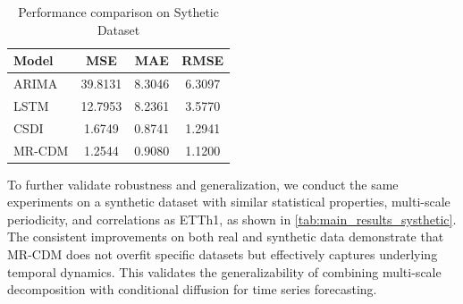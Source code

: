 
\begin{table}[h]
\centering
\caption{Performance comparison on Sythetic Dataset}
\label{tab:main_results_systhetic}
\begin{tabular}{lccc}
\hline
Model & MSE & MAE & RMSE\\
\hline
ARIMA & {39.8131} & {8.3046} & {6.3097}\\
LSTM & {12.7953} & {8.2361} & {3.5770}\\
CSDI & {1.6749} & {0.8741} & {1.2941}\\
MR-CDM & {1.2544} & {0.9080} & {1.1200}\\
\hline
\end{tabular}
\end{table}

To further validate robustness and generalization, we conduct the same experiments on a synthetic dataset with similar statistical properties, multi-scale periodicity, and correlations as ETTh1, as shown in \autoref{tab:main_results_systhetic}. The consistent improvements on both real and synthetic data demonstrate that MR-CDM does not overfit specific datasets but effectively captures underlying temporal dynamics. This validates the generalizability of combining multi-scale decomposition with conditional diffusion for time series forecasting.

